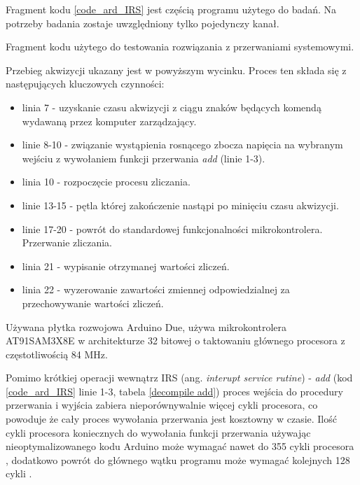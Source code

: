 Fragment kodu \ref{code_ard_IRS} jest częścią programu użytego do badań. Na potrzeby badania zostaje uwzględniony tylko pojedynczy kanał.

\begin{kod}
        
        \caption{Fragment kodu użytego do testowania rozwiązania z przerwaniami systemowymi.}
        \label{code_ard_IRS}
\end{kod}

Przebieg akwizycji ukazany jest w powyższym wycinku. Proces ten składa się z następujących kluczowych czynności:
\begin{itemize}
        \item linia 7 - uzyskanie czasu akwizycji z ciągu znaków będących komendą wydawaną przez komputer zarządzający.
        \item linie 8-10 - związanie wystąpienia rosnącego zbocza napięcia na wybranym wejściu z wywołaniem funkcji przerwania \textit{add} (linie 1-3). 
        \item linia 10 - rozpoczęcie procesu zliczania.
        \item linie 13-15 - pętla której zakończenie nastąpi po minięciu czasu akwizycji.
        \item linie 17-20 - powrót do standardowej funkcjonalności mikrokontrolera. Przerwanie zliczania.
        \item linia 21 - wypisanie otrzymanej wartości zliczeń. 
        \item linia 22 - wyzerowanie zawartości zmiennej odpowiedzialnej za przechowywanie wartości zliczeń.     
\end{itemize}

Używana płytka rozwojowa Arduino Due, używa mikrokontrolera AT91SAM3X8E w architekturze 32 bitowej o taktowaniu głównego procesora z częstotliwością 84 MHz.

Pomimo krótkiej operacji wewnątrz IRS (ang. \textit{interupt service rutine}) - \textit{add} (kod \ref{code_ard_IRS} linie 1-3, tabela \ref{decompile add}) proces wejścia do procedury przerwania i wyjścia zabiera nieporównywalnie więcej cykli procesora, co powoduje że cały proces wywołania przerwania jest kosztowny w czasie. 
Ilość cykli procesora koniecznych do wywołania funkcji przerwania używając nieoptymalizowanego kodu Arduino może wymagać nawet do 355 cykli procesora \cite{ard_opt_git}, dodatkowo powrót do głównego wątku programu może wymagać kolejnych 128 cykli \cite{ard_opt_git}.

